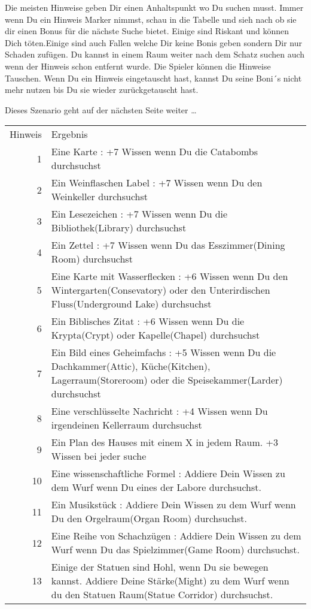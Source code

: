 \begin{itemize}
        \bitem Die meisten Hinweise geben Dir einen Anhaltspunkt wo Du suchen musst.
        Immer wenn Du ein Hinweis Marker nimmst, schau in die Tabelle und sieh nach ob sie dir einen Bonus für die nächste Suche bietet. Einige sind Riskant und können Dich töten.Einige sind auch Fallen welche Dir keine Bonis geben sondern Dir nur Schaden zufügen.
    \bitem Du kannst in einem Raum weiter nach dem Schatz suchen auch wenn der Hinweis schon entfernt wurde.
    \bitem Die Spieler können die Hinweise Tauschen.
    \bitem Wenn Du ein Hinweis eingetauscht hast, kannst Du seine Boni´s nicht mehr nutzen bis Du sie wieder zurückgetauscht hast.
\end{itemize}

\vspace{2cm}

Dieses Szenario geht auf der nächsten Seite weiter …

\newpage

\begin{tabular}{rp{7cm}}
Hinweis & Ergebnis \\
{1} &
Eine Karte : +7 Wissen wenn Du die Catabombs durchsuchst \\
{2} &
Ein Weinflaschen Label : +7 Wissen wenn Du den Weinkeller durchsuchst \\
{3} &
Ein Lesezeichen : +7 Wissen wenn Du die Bibliothek(Library) durchsuchst \\
{4} &
Ein Zettel : +7 Wissen wenn Du das Esszimmer(Dining Room) durchsuchst \\
{5} &
Eine Karte mit Wasserflecken : +6 Wissen wenn Du den Wintergarten(Consevatory) oder den Unterirdischen Fluss(Underground Lake) durchsuchst \\
{6} &
Ein Biblisches Zitat : +6 Wissen wenn Du die Krypta(Crypt) oder Kapelle(Chapel) durchsuchst \\
{7} &
Ein Bild eines Geheimfachs : +5 Wissen wenn Du die Dachkammer(Attic), Küche(Kitchen), Lagerraum(Storeroom) oder die Speisekammer(Larder) durchsuchst \\
{8} &
Eine verschlüsselte Nachricht : +4 Wissen wenn Du irgendeinen Kellerraum durchsuchst \\
{9} &
Ein Plan des Hauses mit einem X in jedem Raum. +3 Wissen bei jeder suche \\
{10} &
Eine wissenschaftliche Formel : Addiere Dein Wissen zu dem Wurf wenn Du eines der Labore durchsuchst. \\
{11} &
Ein Musikstück : Addiere Dein Wissen zu dem Wurf wenn Du den Orgelraum(Organ Room) durchsuchst. \\
{12} &
Eine Reihe von Schachzügen : Addiere Dein Wissen zu dem Wurf wenn Du das Spielzimmer(Game Room) durchsuchst. \\
{13} &
Einige der Statuen sind Hohl, wenn Du sie bewegen kannst. Addiere Deine Stärke(Might) zu dem Wurf wenn du den Statuen Raum(Statue Corridor) durchsuchst. \\
\end{tabular}


